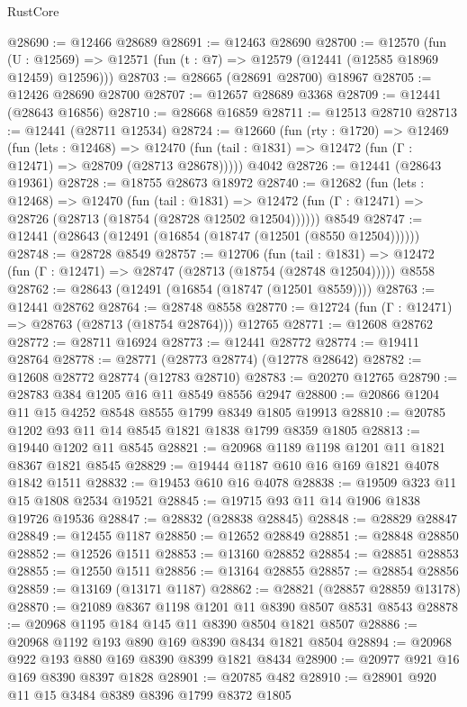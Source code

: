 \begin{lexlean}{RustCore}
\begin{coremodule}
@28690 := @12466 @28689
@28691 := @12463 @28690
@28700 := @12570
    (fun (U : @12569) => @12571 (fun (t : @7) => @12579 (@12441 (@12585 @18969 @12459) @12596)))
@28703 := @28665 (@28691 @28700) @18967
@28705 := @12426 @28690 @28700
@28707 := @12657 @28689 @3368
@28709 := @12441 (@28643 @16856)
@28710 := @28668 @16859
@28711 := @12513 @28710
@28713 := @12441 (@28711 @12534)
@28724 := @12660
    (fun (rty : @1720) =>
    @12469
      (fun (lets : @12468) =>
      @12470 (fun (tail : @1831) => @12472 (fun (Γ : @12471) => @28709 (@28713 @28678)))))
    @4042
@28726 := @12441 (@28643 @19361)
@28728 := @18755 @28673 @18972
@28740 := @12682
    (fun (lets : @12468) =>
    @12470
      (fun (tail : @1831) =>
      @12472 (fun (Γ : @12471) => @28726 (@28713 (@18754 (@28728 @12502 @12504))))))
    @8549
@28747 := @12441 (@28643 (@12491 (@16854 (@18747 (@12501 (@8550 @12504))))))
@28748 := @28728 @8549
@28757 := @12706
    (fun (tail : @1831) => @12472 (fun (Γ : @12471) => @28747 (@28713 (@18754 (@28748 @12504)))))
    @8558
@28762 := @28643 (@12491 (@16854 (@18747 (@12501 @8559))))
@28763 := @12441 @28762
@28764 := @28748 @8558
@28770 := @12724 (fun (Γ : @12471) => @28763 (@28713 (@18754 @28764))) @12765
@28771 := @12608 @28762
@28772 := @28711 @16924
@28773 := @12441 @28772
@28774 := @19411 @28764
@28778 := @28771 (@28773 @28774) (@12778 @28642)
@28782 := @12608 @28772 @28774 (@12783 @28710)
@28783 := @20270 @12765
@28790 := @28783 @384 @1205 @16 @11 @8549 @8556 @2947
@28800 := @20866 @1204 @11 @15 @4252 @8548 @8555 @1799 @8349 @1805 @19913
@28810 := @20785 @1202 @93 @11 @14 @8545 @1821 @1838 @1799 @8359 @1805
@28813 := @19440 @1202 @11 @8545
@28821 := @20968 @1189 @1198 @1201 @11 @1821 @8367 @1821 @8545
@28829 := @19444 @1187 @610 @16 @169 @1821 @4078 @1842 @1511
@28832 := @19453 @610 @16 @4078
@28838 := @19509 @323 @11 @15 @1808 @2534 @19521
@28845 := @19715 @93 @11 @14 @1906 @1838 @19726 @19536
@28847 := @28832 (@28838 @28845)
@28848 := @28829 @28847
@28849 := @12455 @1187
@28850 := @12652 @28849
@28851 := @28848 @28850
@28852 := @12526 @1511
@28853 := @13160 @28852
@28854 := @28851 @28853
@28855 := @12550 @1511
@28856 := @13164 @28855
@28857 := @28854 @28856
@28859 := @13169 (@13171 @1187)
@28862 := @28821 (@28857 @28859 @13178)
@28870 := @21089 @8367 @1198 @1201 @11 @8390 @8507 @8531 @8543
@28878 := @20968 @1195 @184 @145 @11 @8390 @8504 @1821 @8507
@28886 := @20968 @1192 @193 @890 @169 @8390 @8434 @1821 @8504
@28894 := @20968 @922 @193 @880 @169 @8390 @8399 @1821 @8434
@28900 := @20977 @921 @16 @169 @8390 @8397 @1828
@28901 := @20785 @482
@28910 := @28901 @920 @11 @15 @3484 @8389 @8396 @1799 @8372 @1805

\end{coremodule}
\end{lexlean}
